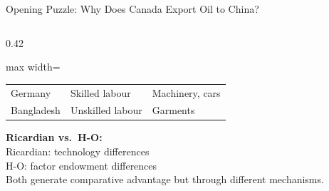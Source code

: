 \documentclass[aspectratio=169]{beamer}
\begin{document}
\begin{frame}[shrink=10]{Opening Puzzle: Why Does Canada Export Oil to China?}
\begin{columns}[T]
\begin{column}{0.42\textwidth}
\begin{adjustbox}{max width=\columnwidth}
\begin{tabular}{lll}
Germany & Skilled labour & Machinery, cars\\
Bangladesh & Unskilled labour & Garments\\
\bottomrule
\end{tabular}
\end{adjustbox}
\vspace{0.4em}
\begin{varbox}
\small\textbf{Ricardian vs.\ H-O:}\\[0.2em]
Ricardian: technology differences\\
H-O: factor endowment differences\\[0.2em]
Both generate comparative advantage
but through different mechanisms.
\end{varbox}
\end{column}
\end{columns}
\end{frame}
\end{document}
